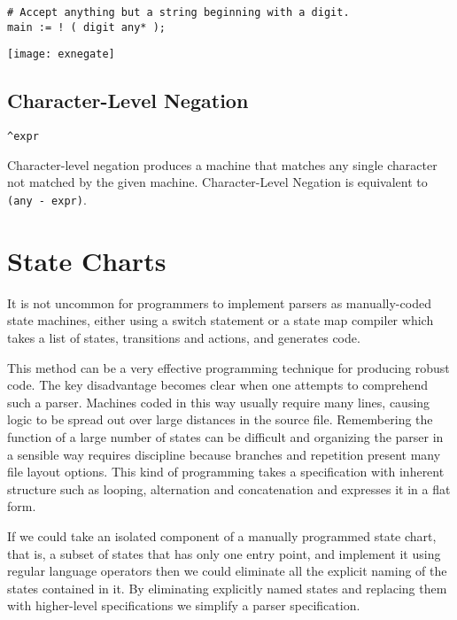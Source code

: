 \documentclass[letterpaper,11pt,oneside]{book}
\newcommand{\verbspace}{\vspace{10pt}}
\newcommand{\graphspace}{\vspace{10pt}}
\newenvironment{inline_code}{\def\baselinestretch{1}\vspace{12pt}\small}{}
\begin{document}
\begin{inline_code}
\begin{verbatim}
# Accept anything but a string beginning with a digit.
main := ! ( digit any* );
\end{verbatim}
\end{inline_code}

\graphspace
\begin{center}
\texttt{[image: exnegate]}
\end{center}
\graphspace


\subsection{Character-Level Negation}

\verb|^expr|
\verbspace

Character-level negation produces a machine that matches any single character
not matched by the given machine. Character-Level Negation is equivalent to
\verb|(any - expr)|.

\section{State Charts}

It is not uncommon for programmers to implement
parsers as manually-coded state machines, either using a switch statement or a
state map compiler which takes a list of states, transitions and actions, and
generates code. 

This method can be a very effective programming technique for producing robust
code. The key disadvantage becomes clear when one attempts to comprehend such a
parser. Machines coded in this way usually require many lines, causing logic to
be spread out over large distances in the source file. Remembering the function
of a large number of states can be difficult and organizing the parser in a
sensible way requires discipline because branches and repetition present many
file layout options.  This kind of programming takes a specification with
inherent structure such as looping, alternation and concatenation and expresses
it in a flat form. 

If we could take an isolated component of a manually programmed state chart,
that is, a subset of states that has only one entry point, and implement it
using regular language operators then we could eliminate all the explicit
naming of the states contained in it. By eliminating explicitly named states
and replacing them with higher-level specifications we simplify a parser
specification.
\end{document}
